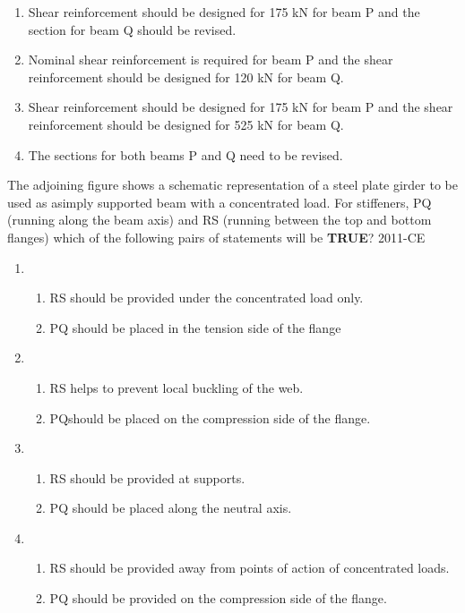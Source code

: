 	\begin{enumerate}
		\item Shear reinforcement should be designed for 175 kN for beam P and the section for beam Q should be revised.
		\item Nominal shear reinforcement is required for beam P and the shear reinforcement should be designed for 120 kN for beam Q.
		\item Shear reinforcement should be designed for 175 kN for beam P and the shear reinforcement should be designed for 525 kN for beam Q.
		\item The sections for both beams P and Q need to be revised.
	\end{enumerate}



\item The adjoining figure shows a schematic representation of a steel plate girder to be used as asimply supported beam with a concentrated load. For stiffeners, PQ (running along the beam axis) and RS (running between the top and bottom flanges) which of the following pairs of statements will be \textbf{TRUE}?
	\hfill{2011-CE}

\begin{figure}[ht]
\centering

\end{figure}
	\begin{enumerate}
		\item \begin{enumerate}
				\item RS should be provided under the concentrated load only.
				\item PQ should be placed in the tension side of the flange
			\end{enumerate}
		\item \begin{enumerate}
				\item RS helps to prevent local buckling of the web.
				\item PQshould be placed on the compression side of the flange.
			\end{enumerate}
		\item \begin{enumerate}
				\item RS should be provided at supports.
				\item PQ should be placed along the neutral axis.
			\end{enumerate}
		\item \begin{enumerate}
				\item RS should be provided away from points of action of concentrated loads.
				\item PQ should be provided on the compression side of the flange.
			\end{enumerate}
	\end{enumerate}

